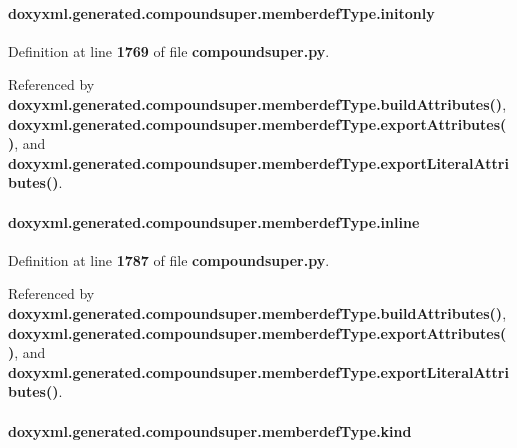 \paragraph[{initonly}]{\setlength{\rightskip}{0pt plus 5cm}doxyxml.\+generated.\+compoundsuper.\+memberdef\+Type.\+initonly}\label{classdoxyxml_1_1generated_1_1compoundsuper_1_1memberdefType_aa36df4d79430588e3701bbc2da3f5862}


Definition at line {\bf 1769} of file {\bf compoundsuper.\+py}.



Referenced by {\bf doxyxml.\+generated.\+compoundsuper.\+memberdef\+Type.\+build\+Attributes()}, {\bf doxyxml.\+generated.\+compoundsuper.\+memberdef\+Type.\+export\+Attributes()}, and {\bf doxyxml.\+generated.\+compoundsuper.\+memberdef\+Type.\+export\+Literal\+Attributes()}.

\paragraph[{inline}]{\setlength{\rightskip}{0pt plus 5cm}doxyxml.\+generated.\+compoundsuper.\+memberdef\+Type.\+inline}\label{classdoxyxml_1_1generated_1_1compoundsuper_1_1memberdefType_a1d6c852643a1018d80158b38408abb17}


Definition at line {\bf 1787} of file {\bf compoundsuper.\+py}.



Referenced by {\bf doxyxml.\+generated.\+compoundsuper.\+memberdef\+Type.\+build\+Attributes()}, {\bf doxyxml.\+generated.\+compoundsuper.\+memberdef\+Type.\+export\+Attributes()}, and {\bf doxyxml.\+generated.\+compoundsuper.\+memberdef\+Type.\+export\+Literal\+Attributes()}.

\paragraph[{kind}]{\setlength{\rightskip}{0pt plus 5cm}doxyxml.\+generated.\+compoundsuper.\+memberdef\+Type.\+kind}\label{classdoxyxml_1_1generated_1_1compoundsuper_1_1memberdefType_a304323219a5f5e410f50a98e6397b829}


